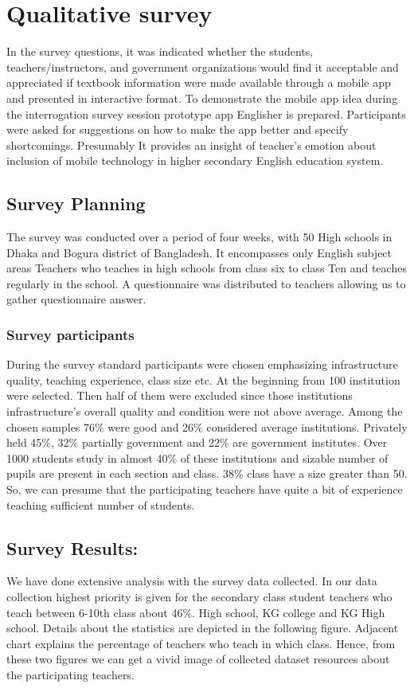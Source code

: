 \documentclass[sn-mathphys,Numbered]{sn-jnl}%
\theoremstyle{thmstyleone}%
\theoremstyle{thmstyletwo}%
\theoremstyle{thmstylethree}%
\begin{document}
\section{Qualitative survey}
In the survey questions, it was indicated whether the students, teachers/instructors, and government organizations would find it acceptable and appreciated if textbook information were made available through a mobile app and presented in interactive format. To demonstrate the mobile app idea during the interrogation survey session prototype app Englisher is prepared. Participants were asked for suggestions on how to make the app better and specify shortcomings. Presumably It provides an insight of teacher’s emotion about inclusion of mobile technology in higher secondary English education system. 

\subsection{Survey Planning}
The survey was conducted over a period of four weeks, with 50 High schools in Dhaka and Bogura district of Bangladesh. It encompasses only English subject areas Teachers who teaches in high schools from class six to class Ten and teaches regularly in the school. A questionnaire was distributed to teachers allowing us to gather questionnaire answer. 
\subsubsection{Survey participants}
During the survey standard participants were chosen emphasizing infrastructure quality, teaching experience, class size etc. At the beginning from 100 institution were selected. Then half of them were excluded since those institutions infrastructure's overall quality and condition were not above average. Among the chosen samples 76\% were good and 26\% considered average institutions. Privately held 45\%, 32\% partially government and 22\% are government institutes.  Over 1000 students study in almost 40\% of these institutions and  sizable number of pupils are present in each section and class. 38\% class have a size greater than 50. So, we can presume that the participating teachers have quite a bit of experience teaching sufficient number of students.  
\subsection{Survey Results:}
We have done extensive analysis with the survey data collected. In our data collection highest priority is given for the secondary class student teachers who teach between 6-10th class about 46\%. High school, KG college and KG High school. Details about the statistics are depicted in the following figure. Adjacent chart explains the percentage of teachers who teach in which class. Hence, from these two figures we can get a vivid image of collected dataset resources about the participating teachers. 
\end{document}
